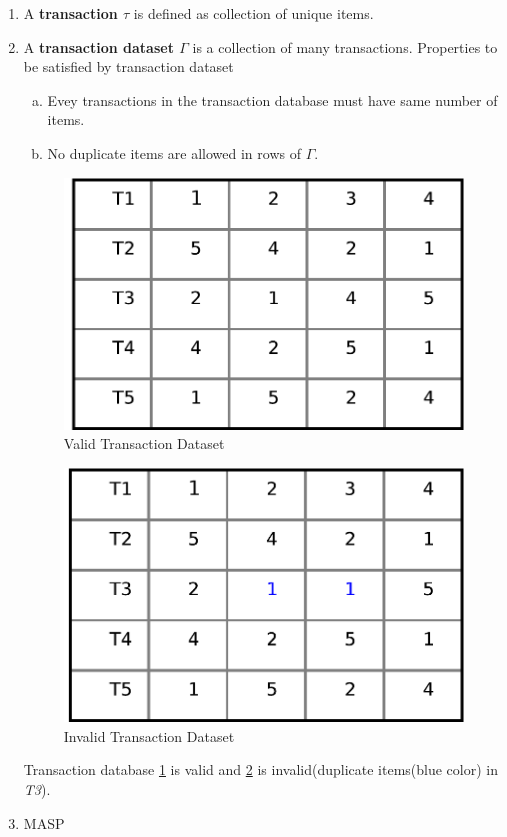 \documentclass[review]{elsarticle}
\begin{document}
\begin{enumerate}[1.]
\item A \textbf{transaction $ \tau $} is defined as collection of unique items.
\item A \textbf{transaction dataset $ \Gamma $} is a collection of many transactions. Properties to be satisfied by transaction dataset
\begin{enumerate}[a)]
\item Evey transactions in the transaction database must have same number of items.
\item No duplicate items are allowed in rows of $ \Gamma $.
\end{enumerate}

\begin{figure}
\begin{center}
\includegraphics[scale=0.4]{pdf/validtrans}
\end{center}
\caption{Valid Transaction Dataset}
\label{Fig 1}
\end{figure}

\begin{figure}
\begin{center}
\includegraphics[scale=0.4]{pdf/invalidtrans}
\end{center}
\caption{Invalid Transaction Dataset}
\label{Fig 2}
\end{figure}

Transaction database \ref{Fig 1} is valid and \ref{Fig 2} is invalid(duplicate items(blue color) in \emph{T3}).

\item MASP


\end{enumerate}
\end{document}
